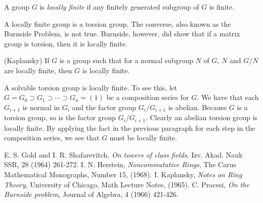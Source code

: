 \documentclass[12pt]{article}
\begin{document}
A group $G$ is \emph{locally finite} if any finitely generated subgroup of $G$ is finite.

A locally finite group is a torsion group.  The converse, also known as the Burnside Problem, is not true.  Burnside, however, did show that if a matrix group is torsion, then it is locally finite.

(Kaplansky) If $G$ is a group such that for a normal subgroup $N$ of $G$, $N$ and $G/N$ are locally finite, then $G$ is locally finite.

A solvable torsion group is locally finite.  To see this, let $G = G_0 \supset G_1 \supset \cdots \supset G_n = (1)$ be a composition series for $G$.  We have that each $G_{i+1}$ is normal in $G_i$ and the factor group $G_i/G_{i+1}$ is abelian.  Because $G$ is a torsion group, so is the factor group $G_i/G_{i+1}$.  Clearly an abelian torsion group is locally finite.  By applying the fact in the previous paragraph for each step in the composition series, we see that $G$ must be locally finite.

\begin{thebibliography}{9}
 E. S. Gold and I. R. Shafarevitch, {\em On towers of class fields}, Izv. Akad. Nauk SSR, 28 (1964) 261-272.
 I. N. Herstein, {\em Noncommutative Rings}, The Carus Mathematical Monographs, Number 15, (1968).
 I. Kaplansky, {\em Notes on Ring Theory}, University of Chicago, Math Lecture Notes, (1965).
 C. Procesi, {\em On the Burnside problem}, Journal of Algebra, 4 (1966) 421-426.
\end{thebibliography}
\end{document}

